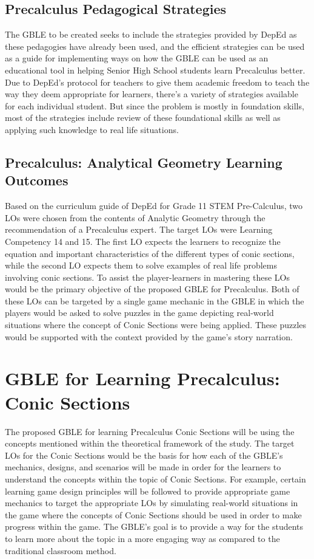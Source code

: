 \subsection{Precalculus Pedagogical Strategies}
The GBLE to be created seeks to include the strategies provided by DepEd as these pedagogies have already been used, and the efficient strategies can be used as a guide for implementing ways on how the GBLE can be used as an educational tool in helping Senior High School students learn Precalculus better. Due to DepEd's protocol for teachers to give them academic freedom to teach the way they deem appropriate for learners, there's a variety of strategies available for each individual student. But since the problem is mostly in foundation skills, most of the strategies include review of these foundational skills as well as applying such knowledge to real life situations.
\subsection{Precalculus: Analytical Geometry Learning Outcomes}
Based on the curriculum guide of DepEd for Grade 11 STEM Pre-Calculus, two LOs were chosen from the contents of Analytic Geometry through the recommendation of a Precalculus expert. The target LOs were Learning Competency 14 and 15. The first LO expects the learners to recognize the equation and important characteristics of the different types of conic sections, while the second LO expects them to solve examples of real life problems involving conic sections. To assist the player-learners in mastering these LOs would be the primary objective of the proposed GBLE for Precalculus. Both of these LOs can be targeted by a single game mechanic in the GBLE in which the players would be asked to solve puzzles in the game depicting real-world situations where the concept of Conic Sections were being applied. These puzzles would be supported with the context provided by the game’s story narration.

\section{GBLE for Learning Precalculus: Conic Sections}
The proposed GBLE for learning Precalculus Conic Sections will be using the concepts mentioned within the theoretical framework of the study. The target LOs for the Conic Sections would be the basis for how each of the GBLE’s mechanics, designs, and scenarios will be made in order for the learners to understand the concepts within the topic of Conic Sections. For example, certain learning game design principles will be followed to provide appropriate game mechanics to target the appropriate LOs by simulating real-world situations in the game where the concepts of Conic Sections should be used in order to make progress within the game. The GBLE’s goal is to provide a way for the students to learn more about the topic in a more engaging way as compared to the traditional classroom method.

